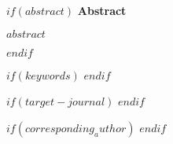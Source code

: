 
\begin{titlepage}

{\let\newpage\relax\maketitle}

\begin{singlespace}

$if(abstract)$
  \noindent\textbf{Abstract} \par
  \vskip 5pt
  \noindent $abstract$ \par
  \vskip 10pt
$endif$

$if(keywords)$
  \vskip 10pt
$endif$

$if(target-journal)$
  \vskip 10pt
$endif$

\vfill  %

$if(corresponding_author)$
$endif$

\end{singlespace}

\end{titlepage}

